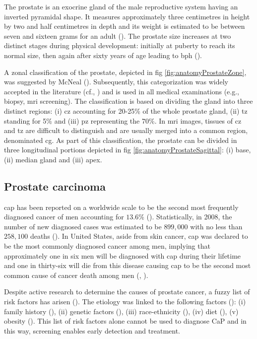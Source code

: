 The prostate is an exocrine gland of the male reproductive system having an inverted pyramidal shape. It measures approximately three centimetres in height by two and half centimetres in depth and its weight is estimated to be between seven and sixteen grams for an adult (\cite{Leissner1979}). The prostate size increases at two distinct stages during physical development: initially at puberty to reach its normal size, then again after sixty years of age leading to \ac{bph} (\cite{Parfait2010}).

A zonal classification of the prostate, depicted in \acs{fig} \ref{fig:anatomyProstateZone}, was suggested by McNeal (\cite{McNeal1981}). Subsequently, this categorization was widely accepted in the literature (cf., \cite{Hricak1987,Villers1991,Coakley2000,Parfait2010}) and is used in all medical examinations (e.g., biopsy, \ac{mri} screening). The classification is based on dividing the gland into three distinct regions: (i) \ac{cz} accounting for 20-25\% of the whole prostate gland, (ii) \ac{tz} standing for 5\% and (iii) \ac{pz} representing the 70\%. In \ac{mri} images, tissues of \ac{cz} and \ac{tz} are difficult to distinguish and are usually merged into a common region, denominated \ac{cg}. As part of this classification, the prostate can be divided in three longitudinal portions depicted in \acs{fig} \ref{fig:anatomyProstateSagittal}: (i) base, (ii) median gland and (iii) apex.

\subsection{Prostate carcinoma}\label{subsec:procar}

\ac{cap} has been reported on a worldwide scale to be the second most frequently diagnosed cancer of men accounting for $13.6 \%$ (\cite{Ferlay2010}). Statistically, in 2008, the number of new diagnosed cases was estimated to be $899,000$ with no less than $258,100$ deaths (\cite{Ferlay2010}). In United States, aside from skin cancer, \ac{cap} was declared to be the most commonly diagnosed cancer among men, implying that approximately one in six men will be diagnosed with \ac{cap} during their lifetime and one in thirty-six will die from this disease causing \ac{cap} to be the second most common cause of cancer death among men (\cite{Siegel2013}, \cite{Society2013}).

Despite active research to determine the causes of prostate cancer, a fuzzy list of risk factors has arisen (\cite{Society2010}). The etiology was linked to the following factors (\cite{Society2010}): (i) family history (\cite{Giovannucci2007,Steinberg1990}), (ii) genetic factors (\cite{Freedman2006,Amundadottir2006,Agalliu2009}), (iii) race-ethnicity (\cite{Giovannucci2007,Hoffman2001}), (iv) diet (\cite{Giovannucci2007,Ma2009,Alexander2010}), (v) obesity (\cite{Giovannucci2007,Rodriguez2007}). This list of risk factors alone cannot be used to diagnose CaP and in this way, screening enables early detection and treatment.

